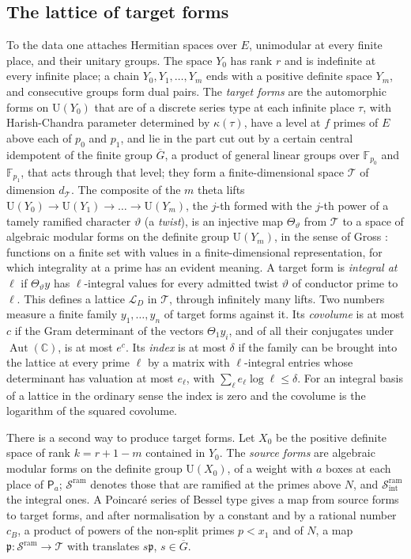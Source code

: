 \documentclass[10pt]{amsart}
\theoremstyle{definition}
\theoremstyle{remark}
\newcommand{\C}{\mathbb C}
\newcommand{\F}{\mathbb F}
\newcommand{\U}{\mathrm U}
\newcommand{\cT}{\mathcal T}
\newcommand{\cS}{\mathcal S^{\mathrm{ram}}}
\newcommand{\cSi}{\mathcal S^{\mathrm{ram}}_{\mathrm{int}}}
\newcommand{\cL}{\mathcal L_D}
\newcommand{\dT}{d_{\mathcal T}}
\newcommand{\Pa}{\mathsf P_a}
\newcommand{\pp}{\mathfrak p}
\newcommand{\Gbar}{\overline G}
\begin{document}
\subsection{The lattice of target forms}
To the data one attaches Hermitian spaces over $E$, unimodular at every finite place, and their
unitary groups. The space $Y_0$ has rank $r$ and is indefinite at every infinite place; a chain
$Y_0,Y_1,\dots,Y_m$ ends with a positive definite space $Y_m$, and consecutive groups form dual
pairs. The \emph{target forms} are the automorphic forms on $\U(Y_0)$ that are of a discrete
series type at each infinite place $\tau$, with Harish-Chandra parameter determined by
$\kappa(\tau)$, have a level at $f$ primes of $E$ above each of $p_0$ and $p_1$, and lie in the part cut out by a
certain central idempotent of the finite group $\Gbar$, a product of general linear groups over
$\F_{p_0}$ and $\F_{p_1}$, that acts through that level; they form a
finite-dimensional space $\cT$ of dimension $\dT$. The composite of the $m$ theta lifts
$\U(Y_0)\to\U(Y_1)\to\dots\to\U(Y_m)$, the $j$-th formed with the $j$-th power of a tamely
ramified character $\vartheta$ (a \emph{twist}), is an injective map
$\Theta_\vartheta$ from $\cT$ to a space of algebraic modular forms on the definite group
$\U(Y_m)$, in the sense of Gross \cite{GrossAMF}: functions on a finite set with values in a
finite-dimensional representation, for which integrality at a prime has an evident meaning.
A target form is \emph{integral at $\ell$} if $\Theta_\vartheta y$ has $\ell$-integral values
for every admitted twist $\vartheta$ of conductor prime to $\ell$. This defines a lattice $\cL$
in $\cT$, through infinitely many lifts. Two numbers measure a finite family
$y_1,\dots,y_n$ of target forms against it. Its \emph{covolume} is at most $c$ if the Gram
determinant of the vectors $\Theta_1y_i$, and of all their conjugates under
$\operatorname{Aut}(\C)$, is at most $e^{c}$. Its \emph{index} is at most $\delta$ if the family
can be brought into the lattice at every prime $\ell$ by a matrix with $\ell$-integral entries
whose determinant has valuation at most $e_\ell$, with $\sum_\ell e_\ell\log\ell\le\delta$. For an integral basis of a lattice
in the ordinary sense the index is zero and the covolume is the logarithm of the squared
covolume.

There is a second way to produce target forms. Let $X_0$ be the positive definite space of rank
$k=r+1-m$ contained in $Y_0$. The \emph{source forms} are algebraic modular forms on the
definite group $\U(X_0)$, of a weight with $a$ boxes at each place of $\Pa$; $\cS$ denotes those
that are ramified at the primes above $N$, and $\cSi$ the integral ones. A Poincar\'e series of
Bessel type gives a map from source forms to target forms, and after normalisation by a
constant and by a rational number $c_B$, a product of powers of the non-split primes $p<x_1$
and of $N$, a map $\pp\colon\cS\to\cT$ with translates $s\pp$, $s\in\Gbar$.
\end{document}

